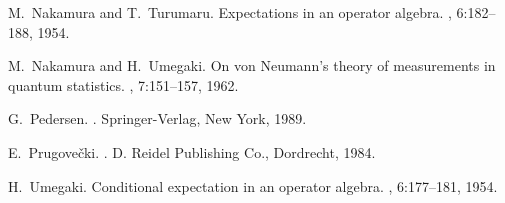 \documentclass[12pt]{amsart}
\theoremstyle{definition}
\begin{document}
\begin{thebibliography}{HLY04}
M.~Nakamura and T.~Turumaru.
\newblock Expectations in an operator algebra.
, 6:182--188, 1954.

M.~Nakamura and H.~Umegaki.
\newblock On von {N}eumann's theory of measurements in quantum statistics.
, 7:151--157, 1962.

G.~Pedersen.
.
\newblock Springer-Verlag, New York, 1989.

E.~Prugove{\v{c}}ki.
.
\newblock D. Reidel Publishing Co., Dordrecht, 1984.

H.~Umegaki.
\newblock Conditional expectation in an operator algebra.
, 6:177--181, 1954.

\end{thebibliography}
\end{document}
